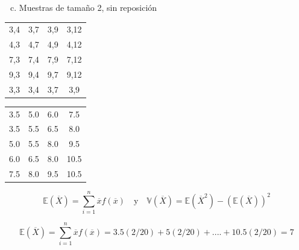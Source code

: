 \documentclass[
  ignorenonframetext,
]{beamer}
\providecommand{\tightlist}{%
  \setlength{\itemsep}{0pt}\setlength{\parskip}{0pt}}
\begin{document}
\begin{frame}{}

\begin{enumerate}
[a.]
\setcounter{enumi}{2}
\tightlist
\item
  Muestras de tamaño 2, sin reposición
\end{enumerate}

\begin{multicols}{2}

\begin{center}
\begin{tabular}{ c c c c }
  3,4 & 3,7 & 3,9 & 3,12\\ 
 4,3  & 4,7 & 4,9 & 4,12\\
 7,3 & 7,4   & 7,9 & 7,12\\
 9,3 & 9,4 & 9,7   & 9,12\\
 3,3 & 3,4 & 3,7 & 3,9
\end{tabular}
\end{center}

\columnbreak

\begin{center}
\begin{tabular}{ c c c c}
    3.5 & 5.0 & 6.0 & 7.5\\ 
 3.5   & 5.5 & 6.5 & 8.0\\
 5.0 & 5.5   & 8.0 & 9.5\\ 
 6.0 & 6.5 & 8.0   & 10.5\\ 
7.5  & 8.0 &9.5& 10.5 
\end{tabular}
\end{center}
\end{multicols}

\[\mathbb{E}(\overline{X})=\sum_{i=1}^{n} \overline{x}f(\overline{x}) \quad\mbox{y} \quad \mathbb{V}(\overline{X})= \mathbb{E}(\overline{X}^2)-(\mathbb{E}(\overline{X}))^2\]

\[\mathbb{E}(\overline{X})=\sum_{i=1}^{n} \overline{x}f(\overline{x})=3.5(2/20)+5(2/20)+....+10.5(2/20)=7 \]

\end{frame}

\hypertarget{section-8}{%
\subsection{}\label{section-8}}
\end{document}
